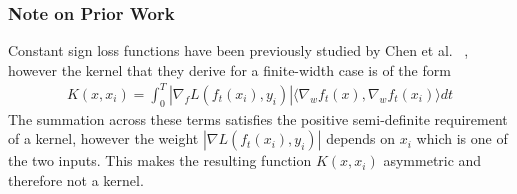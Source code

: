 
  

\begin{frame}
  \frametitle{Note on Prior Work}
Constant sign loss functions have been previously studied by Chen et al. ~\cite{chen2021equivalence}, however the kernel that they derive for a finite-width case is of the form
\begin{align}
    K(x,x_i) =  \int_0^T |\nabla_f L(f_t(x_i), y_i)| \langle \nabla_w f_t(x), \nabla_w f_t(x_i) \rangle dt
\end{align}
The summation across these terms satisfies the positive semi-definite requirement of a kernel, however the weight $|\nabla L(f_t(x_i), y_i)|$ depends on $x_i$ which is one of the two inputs. This makes the resulting function $K(x,x_i)$ asymmetric and therefore not a kernel.
\end{frame}

